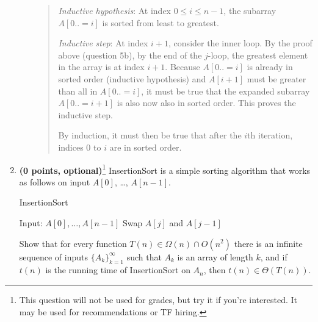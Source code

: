 \documentclass[11pt]{article}
\begin{document}
\begin{enumerate}[leftmargin=*]
\begin{enumerate}
\begin{quote}
        \medskip
        \textit{Inductive hypothesis}: At index $0 \leq i \leq n - 1$, the subarray $A[0..=i]$ is sorted from least to greatest.

        \medskip 
        \textit{Inductive step}: At index $i + 1$, consider the inner loop. By the proof above (question 5b), by the end of the $j$-loop, the greatest element in the array is at index $i + 1$. Because $A[0..=i]$ is already in sorted order (inductive hypothesis) and $A[i + 1]$ must be greater than all in $A[0..=i]$,  it must be true that the expanded subarray $A[0..=i + 1]$ is also now also in sorted order. This proves the inductive step.

        \medskip
        By induction, it must then be true that after the $i$th iteration, indices $0$ to $i$ are in sorted order.
      \end{quote}
\end{enumerate}
    

\item
{\bf (0 points, optional)}\footnote{This question will not be used for grades, but try it if you're interested.
It may be used for recommendations or TF hiring.}
InsertionSort is a simple sorting algorithm that works as follows on input $A[0]$, \ldots, $A[n-1]$.
\begin{algorithm}
\caption{InsertionSort}
\begin{algorithmic}
\STATE Input: $A[0], \dots, A[n-1]$
                \STATE Swap $A[j]$ and $A[j - 1]$
        \ENDWHILE
\ENDFOR
\end{algorithmic}
\end{algorithm}

Show that for every function $T(n) \in \Omega(n) \cap O(n^2)$
there is an infinite sequence of inputs $\{A_k\}_{k=1}^{\infty}$
such that $A_k$ is an array of length $k$, and if $t(n)$ is the running time of
InsertionSort on $A_n$, then $t(n) \in \Theta(T(n))$.


\end{enumerate}
\end{document}
